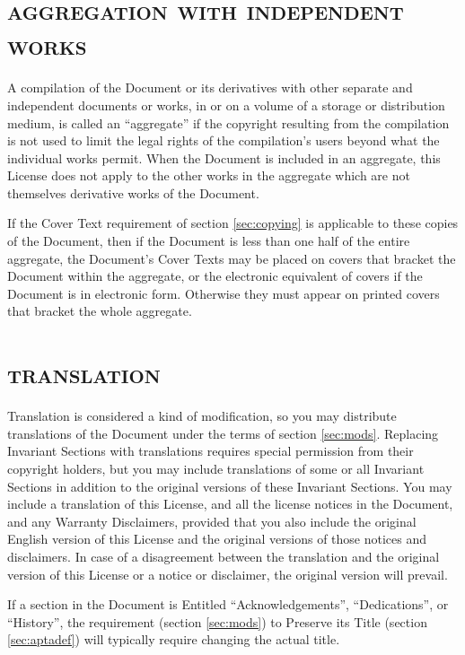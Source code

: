 \section[Aggregation with independent works]{\scshape aggregation with
independent works}

A compilation of the Document or its derivatives with other separate and
independent documents or works, in or on a volume of a storage or
distribution medium, is called an ``aggregate'' if the copyright resulting
from the compilation is not used to limit the legal rights of the
compilation's users beyond what the individual works permit. When the
Document is included in an aggregate, this License does not apply to the
other works in the aggregate which are not themselves derivative works of
the Document.

If the Cover Text requirement of section \ref{sec:copying} is applicable to
these copies of the Document, then if the Document is less than one half of
the entire aggregate, the Document's Cover Texts may be placed on covers
that bracket the Document within the aggregate, or the electronic
equivalent of covers if the Document is in electronic form. Otherwise they
must appear on printed covers that bracket the whole aggregate.


\section[Translation]{\scshape translation}

Translation is considered a kind of modification, so you may distribute
translations of the Document under the terms of section \ref{sec:mods}.
Replacing Invariant Sections with translations requires special permission
from their copyright holders, but you may include translations of some or
all Invariant Sections in addition to the original versions of these
Invariant Sections. You may include a translation of this License, and all
the license notices in the Document, and any Warranty Disclaimers, provided
that you also include the original English version of this License and the
original versions of those notices and disclaimers. In case of a
disagreement between the translation and the original version of this
License or a notice or disclaimer, the original version will prevail.

If a section in the Document is Entitled ``Acknowledgements'',
``Dedications'', or ``History'', the requirement (section \ref{sec:mods})
to Preserve its Title (section \ref{sec:aptadef}) will typically require
changing the actual title.



